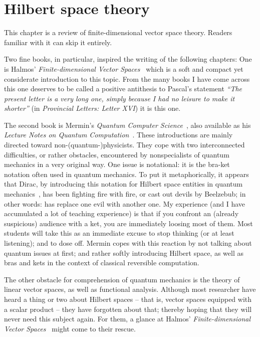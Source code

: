 


\chapter{Hilbert space theory}
\label{2016-pu-book-chapter-hst} %

This chapter is a review of finite-dimensional vector space theory.
Readers familiar with it can skip it entirely.


Two fine books, in particular, inspired the writing of the following chapters:
One is Halmos' {\em Finite-dimensional Vector Spaces}~\cite{halmos-vs}
which is a soft and compact yet considerate introduction to this topic.
From the many books I have come across this one deserves to be called a positive antithesis to
Pascal's statement
{\it ``The present letter is a very long one, simply because I had no leisure to make it shorter''}
(in {\it Provincial Letters: Letter XVI}) it is this one.

The second book is Mermin's {\em Quantum Computer Science}~\cite{mermin-07},
also available as his {\em Lecture Notes on Quantum Computation}~\cite{mermin-04}.
These introductions are mainly directed toward non-(quantum-)physicists.
They cope with two interconnected difficulties, or rather obstacles, encountered by nonspecialists of quantum mechanics in a very original way.
One issue is notational: it is the bra-ket notation often used in quantum mechanics.
To put it metaphorically, it appears that Dirac, by introducing this notation for Hilbert space entities in quantum mechanics~\cite{dirac},
has been fighting fire with fire, or cast out devils by Beelzebub; in other words:  has replace one evil with another one.
My experience (and I have accumulated  a lot of teaching experience) is that if you confront an (already suspicious) audience with a ket, you are immediately
loosing most of them.
Most students will take this as an immediate excuse to stop thinking (or at least listening); and to dose off.
Mermin copes with this reaction by not talking about quantum issues at first;
and rather softly introducing Hilbert space, as well as bras and kets in the context of classical reversible computation.

The other obstacle for comprehension of quantum mechanics is the theory of linear vector spaces, as well as functional analysis.
Although most researcher have heard a thing or two about Hilbert spaces -- that is, vector spaces equipped with a scalar product
-- they have forgotten about that; thereby hoping that they will never need this subject again.
For them, a glance at Halmos' {\em Finite-dimensional Vector Spaces}~\cite{halmos-vs} might come to their rescue.


